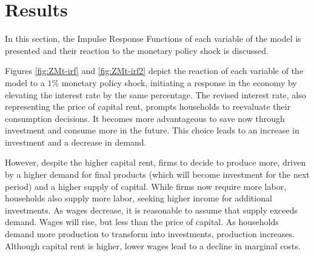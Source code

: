 \documentclass[../thesis.tex]{subfiles}
\begin{document}
	\newpage

	\section{Results}\label{sec:results}	

	In this section, the Impulse Response Functions of each variable of the model is presented and their reaction to the monetary policy shock is discussed.
	
	
	Figures \eqref{fig:ZMt-irf} and \eqref{fig:ZMt-irf2} depict the reaction of each variable of the model to a $1\%$ monetary policy shock, initiating a response in the economy by elevating the interest rate by the same percentage. The revised interest rate, also representing the price of capital rent, prompts households to reevaluate their consumption decisions. It becomes more advantageous to save now through investment and consume more in the future. This choice leads to an increase in investment and a decrease in demand.
	
	However, despite the higher capital rent, firms to decide to produce more, driven by a higher demand for final products (which will become investment for the next period) and a higher supply of capital. While firms now require more labor, households also supply more labor, seeking higher income for additional investments. As wages decrease, it is reasonable to assume that supply exceeds demand. Wages will rise, but less than the price of capital. As households demand more production to transform into investments, production increases. Although capital rent is higher, lower wages lead to a decline in marginal costs.
	
\end{document}
